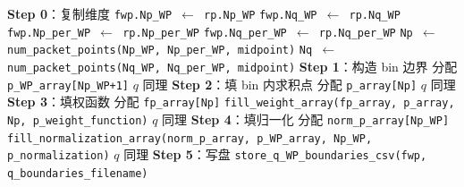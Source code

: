 \begin{algorithm}[H]
\caption{BUILD-WP-STATES（详细）：\texttt{make\_fwp\_statespace} 主流程}
\label{alg:ch06-build-wp-states}
\BlankLine
\textbf{Step 0}：复制维度
\Indp
   \texttt{fwp.Np\_WP $\leftarrow$ rp.Np\_WP}\;
   \texttt{fwp.Nq\_WP $\leftarrow$ rp.Nq\_WP}\;
   \texttt{fwp.Np\_per\_WP $\leftarrow$ rp.Np\_per\_WP}\;
   \texttt{fwp.Nq\_per\_WP $\leftarrow$ rp.Nq\_per\_WP}\;
   \texttt{Np $\leftarrow$ num\_packet\_points(Np\_WP, Np\_per\_WP, midpoint)}\;
   \texttt{Nq $\leftarrow$ num\_packet\_points(Nq\_WP, Nq\_per\_WP, midpoint)}\;
\Indm
\textbf{Step 1}：构造 bin 边界
\Indp
   分配 \texttt{p\_WP\_array[Np\_WP+1]}\;
   \(q\) 同理\;
\Indm
\textbf{Step 2}：填 bin 内求积点
\Indp
   分配 \texttt{p\_array[Np]}\;
   \(q\) 同理\;
\Indm
\textbf{Step 3}：填权函数
\Indp
   分配 \texttt{fp\_array[Np]}\;
   \texttt{fill\_weight\_array(fp\_array, p\_array, Np, p\_weight\_function)}\;
   \(q\) 同理\;
\Indm
\textbf{Step 4}：填归一化
\Indp
   分配 \texttt{norm\_p\_array[Np\_WP]}\;
   \texttt{fill\_normalization\_array(norm\_p\_array, p\_WP\_array, Np\_WP, p\_normalization)}\;
   \(q\) 同理\;
\Indm
\textbf{Step 5}：写盘
\Indp
   \texttt{store\_q\_WP\_boundaries\_csv(fwp, q\_boundaries\_filename)}\;
\Indm
\Return\;
\end{algorithm}

